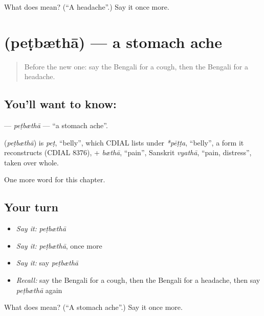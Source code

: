 \begin{tcolorbox}[breakable,colback=teal!4,colframe=teal!35!black,title={Before you move on}]
What does  mean? (\textquotedblleft{}A headache\textquotedblright{}.) Say it once more.
\end{tcolorbox}
\section[\texorpdfstring{\bn{পেটব্যথা} (peṭbæthā)}{পেটব্যথা (peṭbæthā)}]{ (peṭbæthā) — a stomach ache}

\label{lesson:BN-C154-petbtha}



\begin{quote}
Before the new one: say the Bengali for a cough, then the Bengali for a headache.
\end{quote}

\subsection*{You'll want to know: }
\textbf{} — \emph{peṭbæthā} — \textquotedblleft{}a stomach ache\textquotedblright{}.

\begin{cousinweb}
\textbf{} (\emph{peṭbæthā}) is \emph{peṭ}, \textquotedblleft{}belly\textquotedblright{}, which CDIAL lists under \emph{*pēṭṭa}, \textquotedblleft{}belly\textquotedblright{}, a form it reconstructs (CDIAL 8376), + \emph{bæthā}, \textquotedblleft{}pain\textquotedblright{}, Sanskrit \emph{vyathā}, \textquotedblleft{}pain, distress\textquotedblright{}, taken over whole.
\end{cousinweb}

\begin{grammarlens}[title={What you've built}]
One more word for this chapter.
\end{grammarlens}

\subsection*{Your turn}
\begin{itemize}
\raggedright
  \item \emph{Say it:} \emph{peṭbæthā}
  \item \emph{Say it:} \emph{peṭbæthā}, once more
  \item \emph{Say it:} say \emph{peṭbæthā}
  \item \emph{Recall:} say the Bengali for a cough, then the Bengali for a headache, then say \emph{peṭbæthā} again
\end{itemize}

\begin{tcolorbox}[breakable,colback=teal!4,colframe=teal!35!black,title={Before you move on}]
What does  mean? (\textquotedblleft{}A stomach ache\textquotedblright{}.) Say it once more.
\end{tcolorbox}
